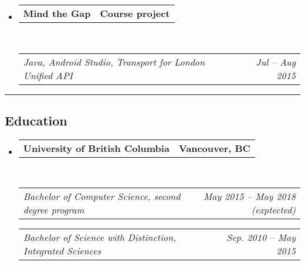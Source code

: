 \documentclass[10pt,letterpaper]{article}
\makeatletter
\newcommand{\headerrow}[2]
{\begin{tabular*}{\linewidth}{l@{\extracolsep{\fill}}r}
	#1 &
	#2 \\
\end{tabular*}}
\makeatother
\begin{document}
\begin{itemize}
	\item
	\headerrow
		{\textbf{Mind the Gap}}
		{\textbf{Course project}}
	\\
	\headerrow
		{\emph{Java, Android Studio, Transport for London Unified API}}
		{\emph{Jul -- Aug 2015}}

\end{itemize}

\hrule
\vspace{-0.4em}

\subsection*{Education}

\begin{itemize}
	\parskip=0.1em

	\item 
	\headerrow
		{\textbf{University of British Columbia}}
		{\textbf{Vancouver, BC}}
	\\
	\headerrow
		{\emph{Bachelor of Computer Science, second degree program}}
		{\emph{May 2015 -- May 2018 (exptected)}}
%	
	\headerrow
		{\emph{Bachelor of Science with Distinction, Integrated Sciences}}
		{\emph{Sep. 2010 -- May 2015}}
\end{itemize}
\end{document}
